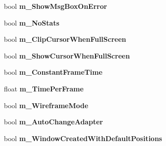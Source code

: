 \begin{DoxyCompactItemize}
\item 
\hypertarget{struct_d_x_u_t_state_1_1_s_t_a_t_e_a004e30340dddb4fa02e7b543aeffefa2}{bool {\bfseries m\+\_\+\+Show\+Msg\+Box\+On\+Error}}\label{struct_d_x_u_t_state_1_1_s_t_a_t_e_a004e30340dddb4fa02e7b543aeffefa2}

\item 
\hypertarget{struct_d_x_u_t_state_1_1_s_t_a_t_e_a1dc5fdc02f30f7b855ab658efa8ef766}{bool {\bfseries m\+\_\+\+No\+Stats}}\label{struct_d_x_u_t_state_1_1_s_t_a_t_e_a1dc5fdc02f30f7b855ab658efa8ef766}

\item 
\hypertarget{struct_d_x_u_t_state_1_1_s_t_a_t_e_a2e774e7182004e2dc8886b4eda221667}{bool {\bfseries m\+\_\+\+Clip\+Cursor\+When\+Full\+Screen}}\label{struct_d_x_u_t_state_1_1_s_t_a_t_e_a2e774e7182004e2dc8886b4eda221667}

\item 
\hypertarget{struct_d_x_u_t_state_1_1_s_t_a_t_e_ab2e16be5d482a6e743ec3a82dea880fb}{bool {\bfseries m\+\_\+\+Show\+Cursor\+When\+Full\+Screen}}\label{struct_d_x_u_t_state_1_1_s_t_a_t_e_ab2e16be5d482a6e743ec3a82dea880fb}

\item 
\hypertarget{struct_d_x_u_t_state_1_1_s_t_a_t_e_a783529e74698e9a454c88bd5dc2a8b36}{bool {\bfseries m\+\_\+\+Constant\+Frame\+Time}}\label{struct_d_x_u_t_state_1_1_s_t_a_t_e_a783529e74698e9a454c88bd5dc2a8b36}

\item 
\hypertarget{struct_d_x_u_t_state_1_1_s_t_a_t_e_a88cc5ed3a6c278d8878729cb31807d38}{float {\bfseries m\+\_\+\+Time\+Per\+Frame}}\label{struct_d_x_u_t_state_1_1_s_t_a_t_e_a88cc5ed3a6c278d8878729cb31807d38}

\item 
\hypertarget{struct_d_x_u_t_state_1_1_s_t_a_t_e_a0525b4dffa98dd3f8f6a13b59e8af4d8}{bool {\bfseries m\+\_\+\+Wireframe\+Mode}}\label{struct_d_x_u_t_state_1_1_s_t_a_t_e_a0525b4dffa98dd3f8f6a13b59e8af4d8}

\item 
\hypertarget{struct_d_x_u_t_state_1_1_s_t_a_t_e_a617e6fad467d4ccb7963c19e9d537bc0}{bool {\bfseries m\+\_\+\+Auto\+Change\+Adapter}}\label{struct_d_x_u_t_state_1_1_s_t_a_t_e_a617e6fad467d4ccb7963c19e9d537bc0}

\item 
\hypertarget{struct_d_x_u_t_state_1_1_s_t_a_t_e_a1016f7d74385e9d74b86c6d8fe53176a}{bool {\bfseries m\+\_\+\+Window\+Created\+With\+Default\+Positions}}\label{struct_d_x_u_t_state_1_1_s_t_a_t_e_a1016f7d74385e9d74b86c6d8fe53176a}


\end{DoxyCompactItemize}

